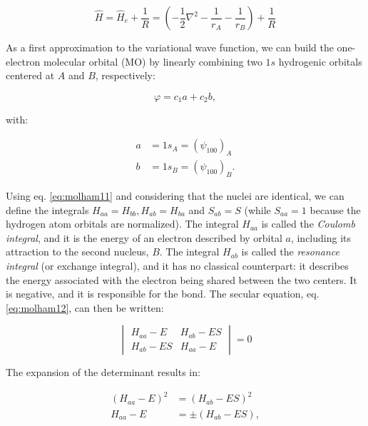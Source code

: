 \documentclass[
  english,
  9pt,
]{extbook}
\theoremstyle{definition}
\theoremstyle{definition}
\theoremstyle{definition}
\theoremstyle{definition}
\theoremstyle{remark}
\begin{document}
\begin{equation}
\hat{H} = \hat{H}_e+\frac{1}{R} = \left( -\frac{1}{2}\nabla^2-\frac{1}{r_A}-\frac{1}{r_B} \right)+\frac{1}{R}
\label{eq:bond1}
\end{equation}

As a first approximation to the variational wave function, we can build the one-electron molecular orbital (MO) by linearly combining two \(1s\) hydrogenic orbitals centered at \(A\) and \(B\), respectively:

\begin{equation}
\varphi = c_1 a + c_2 b,
\label{eq:bond2}
\end{equation}

with:

\begin{equation}
\begin{aligned}
a &= 1s_A = \left( \psi_{100} \right)_A\\
b &= 1s_B = \left( \psi_{100} \right)_B.
\end{aligned}
\label{eq:bond3}
\end{equation}

Using eq. \eqref{eq:molham11} and considering that the nuclei are identical, we can define the integrals \(H_{aa}=H_{bb}, H_{ab}=H_{ba}\) and \(S_{ab}=S\) (while \(S_{aa}=1\) because the hydrogen atom orbitals are normalized). The integral \(H_{aa}\) is called the \emph{Coulomb integral}, and it is the energy of an electron described by orbital \(a\), including its attraction to the second nucleus, \(B\). The integral \(H_{ab}\) is called the \emph{resonance integral} (or exchange integral), and it has no classical counterpart: it describes the energy associated with the electron being shared between the two centers. It is negative, and it is responsible for the bond. The secular equation, eq. \eqref{eq:molham12}, can then be written:

\begin{equation}
\begin{vmatrix}
H_{aa}-E   & H_{ab}-ES \\
H_{ab}-ES  & H_{aa}-E
\end{vmatrix}=0
\label{eq:bond4}
\end{equation}

The expansion of the determinant results in:

\begin{equation}
\begin{aligned}
(H_{aa}-E)^2 &=(H_{ab}-ES)^2 \\
H_{aa}-E &= \pm (H_{ab}-ES), \\
\end{aligned}
\label{eq:bond5}
\end{equation}
\end{document}
